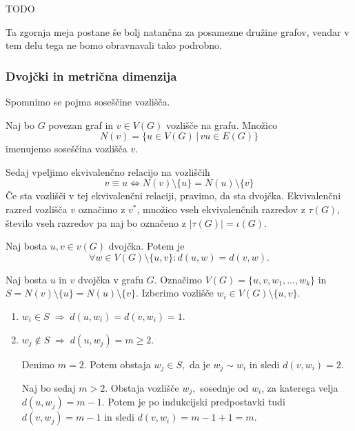 \documentclass[mat1, tisk]{fmfdelo}
\begin{document}
\begin{dokaz}
    TODO
\end{dokaz}

Ta zgornja meja postane še bolj natančna za posamezne družine grafov, vendar v tem delu
tega ne bomo obravnavali tako podrobno.




\subsubsection{Dvojčki in metrična dimenzija} \label{ss:dvojcki_mdim}
Spomnimo se pojma soseščine vozlišča.

\begin{definicija} \label{def:sosescina}
    Naj bo $G$ povezan graf in $v \in V(G)$ vozlišče na grafu. Množico 
    $$N(v) = \{u \in V(G) \, | \,vu \in E(G) \}$$ imenujemo soseščina vozlišča $v$.
\end{definicija}


Sedaj vpeljimo ekvivalenčno relacijo na vozliščih
\begin{equation}\label{eq:dvojcki}
v \equiv u \Leftrightarrow N(v)\setminus \{u\} = N(u) \setminus \{v\}
\end{equation}
Če sta vozlišči v tej ekvivalenčni relaciji, pravimo, da sta dvojčka. 
Ekvivalenčni razred vozlišča $v$ označimo z $v^{*}$, 
množico vseh ekvivalenčnih razredov z $\tau (G)$, število vseh razredov pa naj bo označeno 
z $|\tau(G)| = \iota(G).$


\begin{lema} \label{lema:dvojcki_razdalje}
    Naj bosta $u, v \in v(G)$ dvojčka. Potem je 
    $$\forall w \in V(G) \setminus \{u, v\} : d(u, w) = d(v, w).$$
\end{lema}

\begin{dokaz}
    Naj bosta $u$ in $v$ dvojčka v grafu $G$. Označimo $V(G) = \{u, v, w_1, ..., w_k\}$ 
    in $S = N(v)\setminus \{u\} = N(u) \setminus \{v\}$. Izberimo vozlišče 
    $w_i \in V(G) \setminus \{u, v\}.$
    \begin{enumerate}
        \item $w_i \in S \; \Rightarrow \; d(u, w_i) = d(v, w_i) = 1.$
        \item $w_j \notin S \; \Rightarrow \; d(u, w_j) = m \geq 2$. 
    
        Denimo $m=2.$ Potem obstaja $w_j \in S,$ da je $w_j \sim w_i$ in sledi $d(v, w_i) = 2.$
        
        Naj bo sedaj $m > 2.$ Obstaja vozlišče $w_j,$ sosednje od $w_i$, za katerega velja 
        $d(u, w_j) = m-1.$ Potem je po indukcijski predpostavki tudi $d(v, w_j) = m-1$ in 
        sledi $d(v, w_i) = m-1 + 1 = m.$
    \end{enumerate}
    
\end{dokaz}
\end{document}
